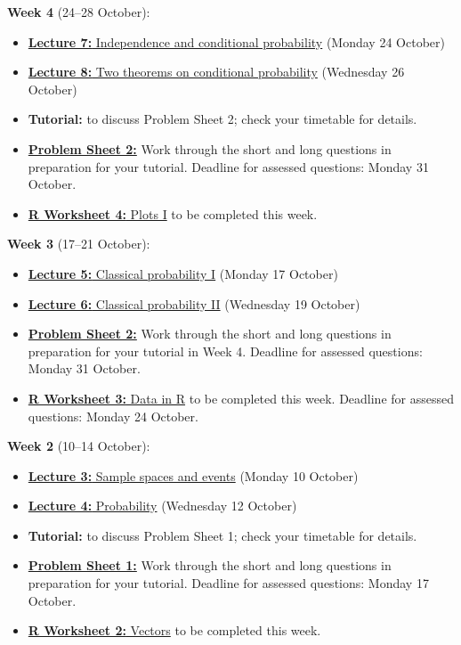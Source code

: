 \documentclass[
  a4paper,
]{book}
\providecommand{\tightlist}{%
  \setlength{\itemsep}{0pt}\setlength{\parskip}{0pt}}
\theoremstyle{definition}
\theoremstyle{definition}
\theoremstyle{definition}
\theoremstyle{definition}
\theoremstyle{remark}
\begin{document}
\textbf{Week 4} (24--28 October):

\begin{itemize}
\tightlist
\item
  \protect\hyperlink{L07-conditional}{\textbf{Lecture 7:} Independence and conditional probability} (Monday 24 October)
\item
  \protect\hyperlink{L08-two-theorems}{\textbf{Lecture 8:} Two theorems on conditional probability} (Wednesday 26 October)
\item
  \textbf{Tutorial:} to discuss Problem Sheet 2; check your timetable for details.
\item
  \protect\hyperlink{P2}{\textbf{Problem Sheet 2:}} Work through the short and long questions in preparation for your tutorial. Deadline for assessed questions: Monday 31 October.
\item
  \protect\hyperlink{r-work}{\textbf{R Worksheet 4:} Plots I} to be completed this week.
\end{itemize}

\textbf{Week 3} (17--21 October):

\begin{itemize}
\tightlist
\item
  \protect\hyperlink{L05-classical-i}{\textbf{Lecture 5:} Classical probability I} (Monday 17 October)
\item
  \protect\hyperlink{L05-classical-ii}{\textbf{Lecture 6:} Classical probability II} (Wednesday 19 October)
\item
  \protect\hyperlink{P2}{\textbf{Problem Sheet 2:}} Work through the short and long questions in preparation for your tutorial in Week 4. Deadline for assessed questions: Monday 31 October.
\item
  \protect\hyperlink{r-work}{\textbf{R Worksheet 3:} Data in R} to be completed this week. Deadline for assessed questions: Monday 24 October.
\end{itemize}

\textbf{Week 2} (10--14 October):

\begin{itemize}
\tightlist
\item
  \protect\hyperlink{L03-events}{\textbf{Lecture 3:} Sample spaces and events} (Monday 10 October)
\item
  \protect\hyperlink{L04-probability}{\textbf{Lecture 4:} Probability} (Wednesday 12 October)
\item
  \textbf{Tutorial:} to discuss Problem Sheet 1; check your timetable for details.
\item
  \protect\hyperlink{P1}{\textbf{Problem Sheet 1:}} Work through the short and long questions in preparation for your tutorial. Deadline for assessed questions: Monday 17 October.
\item
  \protect\hyperlink{r-work}{\textbf{R Worksheet 2:} Vectors} to be completed this week.
\end{itemize}
\end{document}
